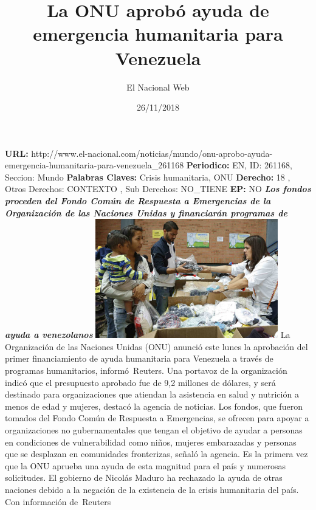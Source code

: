 \documentclass{article}%
\title{\textbf{La ONU aprobó ayuda de emergencia humanitaria para Venezuela}}%
\author{El Nacional Web}%
\date{26/11/2018}%
\begin{document}
%
\normalsize%
\maketitle%
\textbf{URL: }%
http://www.el{-}nacional.com/noticias/mundo/onu{-}aprobo{-}ayuda{-}emergencia{-}humanitaria{-}para{-}venezuela\_261168\newline%
%
\textbf{Periodico: }%
EN, %
ID: %
261168, %
Seccion: %
Mundo\newline%
%
\textbf{Palabras Claves: }%
Crisis humanitaria, ONU\newline%
%
\textbf{Derecho: }%
18%
, Otros Derechos: %
CONTEXTO%
, Sub Derechos: %
NO\_TIENE%
\newline%
%
\textbf{EP: }%
NO\newline%
\newline%
%
\textbf{\textit{Los fondos proceden del Fondo Común de Respuesta a Emergencias de la Organización de las Naciones Unidas y financiarán programas de ayuda a venezolanos}}%
\newline%
\newline%
%
\includegraphics[width=300px]{222.jpg}%
\newline%
%
La Organización de las Naciones Unidas (ONU) anunció este lunes la aprobación del primer financiamiento de ayuda humanitaria para Venezuela a través de programas humanitarios, informó~Reuters.%
\newline%
%
Una portavoz de la organización indicó que el presupuesto aprobado fue de 9,2 millones de dólares, y será destinado para organizaciones que atiendan la asistencia en salud y nutrición a menos de edad y mujeres, destacó la agencia de noticias.%
\newline%
%
Los fondos, que fueron tomados del Fondo Común de Respuesta a Emergencias, se ofrecen para apoyar a organizaciones no gubernamentales que tengan el objetivo de ayudar a personas en condiciones de vulnerabilidad como niños, mujeres embarazadas y personas que se desplazan en comunidades fronterizas, señaló la agencia.%
\newline%
%
Es la primera vez que la ONU aprueba una ayuda de esta magnitud para el país y numerosas solicitudes. El gobierno de Nicolás Maduro ha rechazado la ayuda de otras naciones debido a la negación de la existencia de la crisis humanitaria del país.%
\newline%
%
Con información de~Reuters%
\newline%
%
\end{document}
